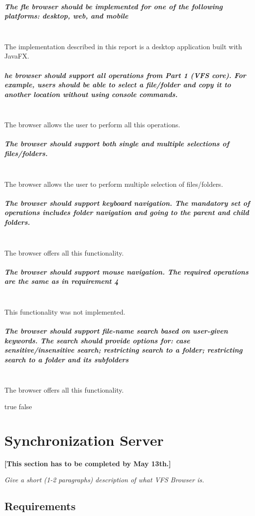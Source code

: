 \documentclass[a4paper,12pt]{article}
\begin{document}
\subparagraph{The fle browser should be implemented for one of the following platforms: desktop, web, and mobile} \hfill\\
The implementation described in this report is a desktop application built with JavaFX.

\subparagraph{he browser should support all operations from Part 1 (\emph{VFS core}). For example, users should be able to select a file/folder and copy it to another location without using console commands.} \hfill\\
The browser allows the user to perform all this operations.

\subparagraph{The browser should support both single and multiple selections of files/folders.} \hfill\\
The browser allows the user to perform multiple selection of files/folders.

\subparagraph{The browser should support keyboard navigation. The mandatory set of operations includes folder navigation and going to the parent and child folders.} \hfill\\
The browser offers all this functionality.

\subparagraph{The browser should support mouse navigation. The required operations are the same as in requirement 4} \hfill\\
This functionality was not implemented.

\subparagraph{The browser should support file-name search based on user-given keywords. The search should provide options for: case sensitive/insensitive search; restricting search to a folder; restricting search to a folder and its subfolders} \hfill\\
The browser offers all this functionality.

\ifx true false


\section{Synchronization Server}

\textbf{[This section has to be completed by May 13th.]}

\emph{Give a short (1-2 paragraphs) description of what VFS Browser is.}


\subsection{Requirements}
\end{document}
